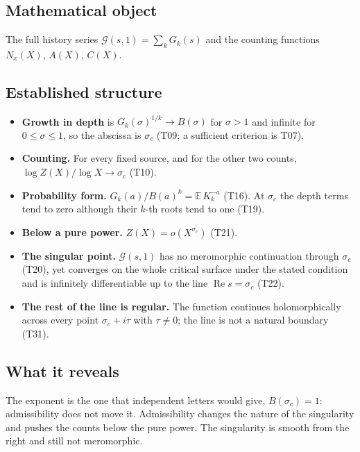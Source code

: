 \documentclass[
  11pt,
]{article}
\providecommand{\tightlist}{%
  \setlength{\itemsep}{0pt}\setlength{\parskip}{0pt}}
\begin{document}
\hypertarget{mathematical-object-2}{%
\subsection{Mathematical object}\label{mathematical-object-2}}

The full history series \(\mathcal G(s,1)=\sum_kG_k(s)\) and the
counting functions \(N_x(X)\), \(A(X)\), \(C(X)\).

\hypertarget{established-structure-2}{%
\subsection{Established structure}\label{established-structure-2}}

\begin{itemize}
\tightlist
\item
  \textbf{Growth in depth} is \(G_k(\sigma)^{1/k}\to B(\sigma)\) for
  \(\sigma>1\) and infinite for \(0\le\sigma\le1\), so the abscissa is
  \(\sigma_c\) (T09; a sufficient criterion is T07).
\item
  \textbf{Counting.} For every fixed source, and for the other two
  counts, \(\log Z(X)/\log X\to\sigma_c\) (T10).
\item
  \textbf{Probability form.} \(G_k(a)/B(a)^k=\mathbb E\,K_k^{-a}\)
  (T16). At \(\sigma_c\) the depth terms tend to zero although their
  \(k\)-th roots tend to one (T19).
\item
  \textbf{Below a pure power.} \(Z(X)=o(X^{\sigma_c})\) (T21).
\item
  \textbf{The singular point.} \(\mathcal G(s,1)\) has no meromorphic
  continuation through \(\sigma_c\) (T20), yet converges on the whole
  critical surface under the stated condition and is infinitely
  differentiable up to the line \(\operatorname{Re}s=\sigma_c\) (T22).
\item
  \textbf{The rest of the line is regular.} The function continues
  holomorphically across every point \(\sigma_c+i\tau\) with
  \(\tau\ne0\); the line is not a natural boundary (T31).
\end{itemize}

\hypertarget{what-it-reveals-2}{%
\subsection{What it reveals}\label{what-it-reveals-2}}

The exponent is the one that independent letters would give,
\(B(\sigma_c)=1\): admissibility does not move it. Admissibility changes
the nature of the singularity and pushes the counts below the pure
power. The singularity is smooth from the right and still not
meromorphic.
\end{document}
